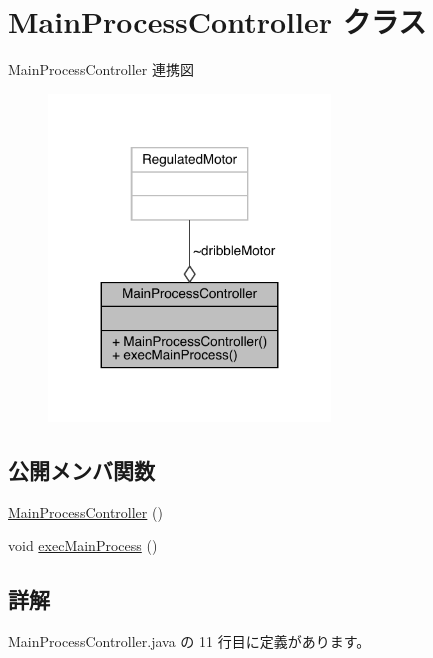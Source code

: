 \hypertarget{class_main_process_controller}{}\section{Main\+Process\+Controller クラス}
\label{class_main_process_controller}


Main\+Process\+Controller 連携図\nopagebreak
\begin{figure}[H]
\begin{center}
\leavevmode
\includegraphics[width=212pt]{df/dc7/class_main_process_controller__coll__graph}
\end{center}
\end{figure}
\subsection*{公開メンバ関数}
\begin{DoxyCompactItemize}
\item 
\mbox{\hyperlink{class_main_process_controller_af422b069cc9f6cadb45a64ef985bd536}{Main\+Process\+Controller}} ()
\item 
void \mbox{\hyperlink{class_main_process_controller_ac92bd6b23aa4c17913d6a9c63ee72739}{exec\+Main\+Process}} ()
\end{DoxyCompactItemize}


\subsection{詳解}


 Main\+Process\+Controller.\+java の 11 行目に定義があります。



